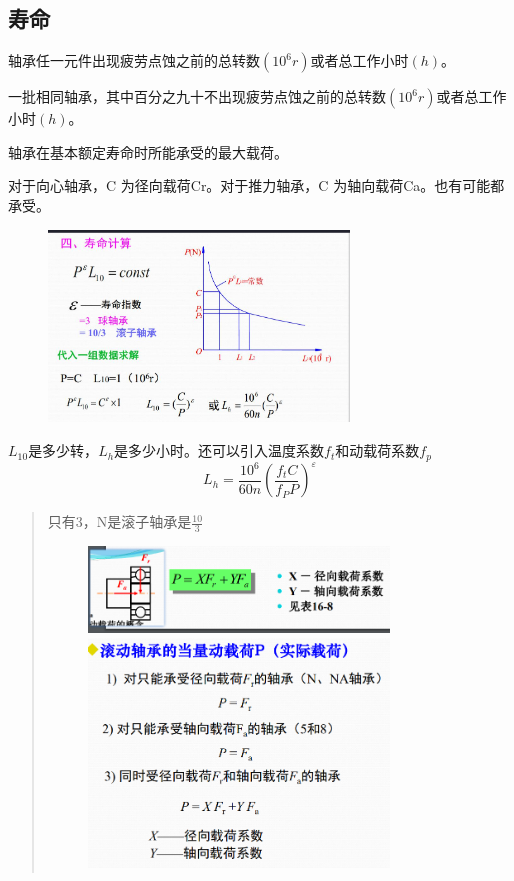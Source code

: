 \documentclass[twocolumn]{ctexart}
\begin{document}
\subsection{寿命}
\begin{description}[leftmargin=1.7cm,style=nextline,nosep]%
  \item[轴承寿命] 轴承任一元件出现疲劳点蚀之前的总转数$(10^6r)$或者总工作小时$(h)$。
  \item[基本额定寿命 $L_{10}$]  一批相同轴承，其中百分之九十不出现疲劳点蚀之前的总转数$(10^6r)$或者总工作小时$(h)$。
   \item[基本额定动载荷] 轴承在基本额定寿命时所能承受的最大载荷。
   \item[当量动载荷]  对于向心轴承，C 为径向载荷Cr。对于推力轴承，C 为轴向载荷Ca。也有可能都承受。
\end{description}
        \begin{figure}[H]
            \centering
            \includegraphics[width=8cm]{img/9.png}
            \end{figure}
$L_{10}$是多少转，$L_{h}$是多少小时。还可以引入温度系数$f_t$和动载荷系数$f_p$
$$ L_{h}= \frac{10^{6}}{60n}(\frac{f_{t}C}{f_{P}P})^{\varepsilon} $$
\begin{quote}
{\qquad{}\ccwd\kaishu{}
只有3，N是滚子轴承是$\displaystyle \frac{10}{3}$
}
        \begin{figure}[H]
            \centering
            \includegraphics[width=8cm]{img/10.png}

            \includegraphics[width=8cm]{img/11.png}
          \end{figure}
\end{quote}
\end{document}
